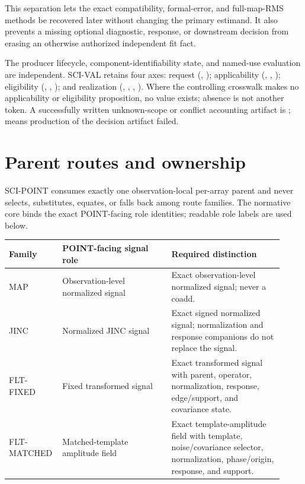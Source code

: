 \documentclass[12pt]{article}
\begin{document}
This separation lets the exact compatibility, formal-error, and full-map-RMS
methods be recovered later without changing the primary estimand. It also
prevents a missing optional diagnostic, response, or downstream decision from
erasing an otherwise authorized independent fit fact.

The producer lifecycle, component-identifiability state, and named-use
evaluation are independent. SCI-VAL retains four axes: request
(, ); applicability
(, , );
eligibility (, ,
); and realization (,
, , ). Where the controlling
crosswalk makes no applicability or eligibility proposition, no value exists;
absence is not another token. A successfully written unknown-scope or conflict
accounting artifact is ;  means production of the
decision artifact failed.

\section{Parent routes and ownership}

SCI-POINT consumes exactly one observation-local per-array parent and never
selects, substitutes, equates, or falls back among route families. The
normative core binds the exact POINT-facing role identities; readable role
labels are used below.

\begin{longtable}{@{}P{0.15\linewidth}P{0.38\linewidth}P{0.39\linewidth}@{}}
\toprule
Family & POINT-facing signal role & Required distinction \\
\midrule
\endhead
MAP & Observation-level normalized signal & Exact observation-level normalized signal; never a coadd. \\
JINC & Normalized JINC signal & Exact signed normalized signal; normalization and response companions do not replace the signal. \\
FLT-FIXED & Fixed transformed signal & Exact transformed signal with parent, operator, normalization, response, edge/support, and covariance state. \\
FLT-MATCHED & Matched-template amplitude field & Exact template-amplitude field with template, noise/covariance selector, normalization, phase/origin, response, and support. \\
\bottomrule
\end{longtable}
\end{document}
